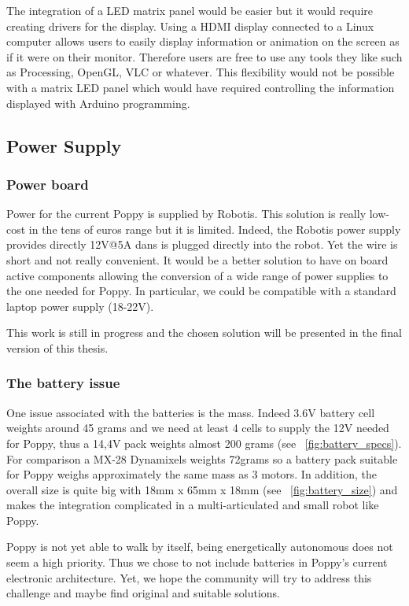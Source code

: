 The integration of a LED matrix panel would be easier but it would require creating drivers for the display.
Using a HDMI display connected to a Linux computer allows users to easily display information or animation on the screen as if it were on their monitor. Therefore users are free to use any tools they like such as Processing, OpenGL, VLC or whatever. This flexibility would not be possible with a matrix LED panel which would have required controlling the information displayed with Arduino programming.

\subsection{Power Supply} %
\label{ssub:alimentation}

\subsubsection{Power board} %
Power for the current Poppy is supplied by Robotis. This solution is really low-cost in the tens of euros range but it is limited. Indeed, the Robotis power supply provides directly 12V@5A dans is plugged directly into the robot. Yet the wire is short and not really convenient. It would be a better solution to have on board active components allowing the conversion of a wide range of power supplies to the one needed for Poppy. In particular, we could be compatible with a standard laptop power supply (18-22V).

This work is still in progress and the chosen solution will be presented in the final version of this thesis.


\subsubsection{The battery issue} %

One issue associated with the batteries is the mass. Indeed 3.6V battery cell weights around 45 grams and we need at least 4 cells to supply the 12V needed for Poppy, thus a 14,4V pack weights almost 200 grams (see \figurename~\ref{fig:battery_specs}). For comparison a MX-28 Dynamixels weights 72grams so a battery pack suitable for Poppy weighs approximately the same mass as 3 motors.
In addition, the overall size is quite big with 18mm x 65mm x 18mm (see \figurename~\ref{fig:battery_size}) and makes the integration complicated in a multi-articulated and small robot like Poppy.

Poppy is not yet able to walk by itself, being energetically autonomous does not seem a high priority. Thus we chose to not include batteries in Poppy’s current electronic architecture. Yet, we hope the community will try to address this challenge and maybe find original and suitable solutions.

